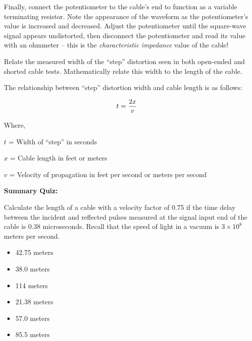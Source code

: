 \vskip 10pt

Finally, connect the potentiometer to the cable's end to function as a variable terminating resistor.  Note the appearance of the waveform as the potentiometer's value is increased and decreased.  Adjust the potentiometer until the square-wave signal appears undistorted, then disconnect the potentiometer and read its value with an ohmmeter -- this is the {\it characteristic impedance} value of the cable!

\vskip 10pt

Relate the measured width of the ``step'' distortion seen in both open-ended and shorted cable tests.  Mathematically relate this width to the length of the cable.







The relationship between ``step'' distortion width and cable length is as follows:

$$t = {2x \over v}$$

\noindent
Where,

$t$ = Width of ``step'' in seconds

$x$ = Cable length in feet or meters

$v$ = Velocity of propagation in feet per second or meters per second

\vskip 10pt







\vfil \eject

\noindent
{\bf Summary Quiz:}

Calculate the length of a cable with a velocity factor of 0.75 if the time delay between the incident and reflected pulses measured at the signal input end of the cable is 0.38 microseconds.  Recall that the speed of light in a vacuum is $3 \times 10^8$ meters per second.

\begin{itemize}
\item{} 42.75 meters 
\vskip 5pt 
\item{} 38.0 meters
\vskip 5pt 
\item{} 114 meters
\vskip 5pt 
\item{} 21.38 meters
\vskip 5pt 
\item{} 57.0 meters
\vskip 5pt 
\item{} 85.5 meters
\end{itemize}





